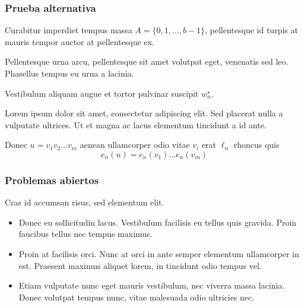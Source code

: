 \documentclass[t, 10pt, mathserif]{beamer}
\begin{document}
\begin{frame}
  \frametitle{Prueba alternativa}

  \medskip
  \begin{definition}
    Curabitur imperdiet tempus massa $A=\{0,1, \ldots, b-1\}$, pellentesque id turpis at mauris tempor auctor at pellentesque ex.
    \pause

    Pellentesque urna arcu, pellentesque sit amet volutpat eget, venenatis sed leo. Phasellus tempus eu urna a lacinia.
    \pause

    Vestibulum aliquam augue et tortor pulvinar suscipit $w^{\star}_n$.
    \pause

    Lorem ipsum dolor sit amet, consectetur adipiscing elit. Sed placerat nulla a vulputate ultrices. Ut et magna ac lacus elementum tincidunt a id ante.

    {\color{magenta}
      Donec $u=v_1 v_2 \ldots v_m$ aenean ullamcorper odio vitae $v_i$ erat $\ell_n$  rhoncus quis
      \[
      e_n(u)=e_n(v_1)\ldots e_n(v_m)
      \]
    }
  \end{definition}
\end{frame}


\begin{frame}
  \frametitle{Problemas abiertos}

  Cras id accumsan risus, sed elementum elit.
  \pause

  \begin{itemize}
    \item Donec eu sollicitudin lacus. Vestibulum facilisis eu tellus quis gravida. Proin faucibus tellus nec tempus maximus.
    \pause
    
    \item Proin at facilisis orci. Nunc at orci in ante semper elementum ullamcorper in est. Praesent maximus aliquet lorem, in tincidunt odio tempus vel.
    \pause

    \item Etiam vulputate nunc eget mauris vestibulum, nec viverra massa lacinia. Donec volutpat tempus nunc, vitae malesuada odio ultricies nec. 
  \end{itemize}
\end{frame}

\setcounter{finalframe}{\value{framenumber}}

\addtocounter{framenumber}{-1}

\end{document}
